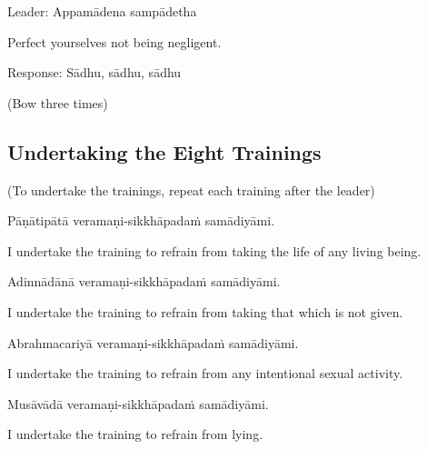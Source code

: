 Leader: Appamādena sampādetha\\

\begin{english}
Perfect yourselves not being negligent.\\
\end{english}

Response: Sādhu, sādhu, sādhu\\

\begin{center}
(Bow three times)\\
\end{center}

\subsection*{Undertaking the Eight Trainings}

\begin{center}
(To undertake the trainings, repeat each training after the leader)\\
\end{center}

Pāṇātipātā veramaṇi-sikkhāpadaṁ samādiyāmi.\\

\begin{english}
I undertake the training to refrain from taking the life of any living being.\\
\end{english}

Adinnādānā veramaṇi-sikkhāpadaṁ samādiyāmi.\\

\begin{english}
I undertake the training to refrain from taking that which is not given.\\
\end{english}

Abrahmacariyā veramaṇi-sikkhāpadaṁ samādiyāmi.\\

\begin{english}
I undertake the training to refrain from any intentional sexual activity.\\
\end{english}

Musāvādā veramaṇi-sikkhāpadaṁ samādiyāmi.\\

\begin{english}
I undertake the training to refrain from lying.\\
\end{english}

